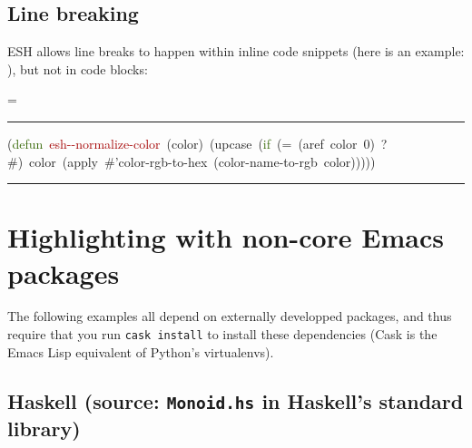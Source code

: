 \documentclass{article}
\makeatletter
\newcommand*{\ESHFontSize}{}
\newcommand*{\ESHFontFamily}{\ttfamily}
\newcommand*{\ESHInlineFontSize}{\ESHFontSize}
\newcommand*{\ESHInlineFontFamily}{\ESHFontFamily}
\newcommand*{\ESHInlineFont}{\ESHInlineFontSize\ESHInlineFontFamily}
\newcommand*{\ESHBlockFontSize}{\ESHFontSize}
\newcommand*{\ESHBlockFontFamily}{\ESHFontFamily}
\newcommand*{\ESHBlockFont}{\ESHBlockFontSize\ESHBlockFontFamily}
\newcommand*{\ESHFallbackFontFamily}{\ESHFontFamily}
\newcommand*{\ESHFallbackFont}{\ESHFallbackFontFamily}
\newcommand*{\ESHNoHyphens}{\hyphenpenalty=10000}
\newcommand*{\ESHConstantSpace}{\spaceskip=\fontdimen2\font\xspaceskip=0pt}
\newcommand*{\ESHCenterInWidthOf}[2]
  {\settowidth\ESHtempdim{#1}%
   \makebox[\ESHtempdim][c]{#2}}
\DeclareRobustCommand*{\ESHText}[1]{\ifmmode{\textnormal{#1}}\else{#1}\fi}
\newcommand*{\ESHIfFontChar}[1]
  {\iffontchar\font`#1{#1}\else{\ESHFallbackFont#1}\fi}
\def\ESHWithFallback#1{\ESHFallbackFont#1}}
\def\ESHWithFallback#1{\ESHIfFontChar{#1}}}}
\def\ESHWithFallback#1{%
     \ifnum\XeTeXfonttype\font>0%
       \ESHIfFontChar{#1}%
     \else%
       \setbox0=\hbox{\tracinglostchars=0\kern1sp#1\expandafter}%
       \ifnum\lastkern=1{\ESHFallbackFont#1}\else{#1}\fi
     \fi}}
\DeclareRobustCommand*{\ESHInlineSpecialChar}[1]
  {{\ESHInlineFontFamily\ESHWithFallback{#1}}}
\DeclareRobustCommand*{\ESHBlockSpecialChar}[1]
  {{\ESHCenterInWidthOf{\ESHBlockFontFamily{a}}{\ESHBlockFontFamily\ESHWithFallback{#1}}}}
\DeclareRobustCommand*{\ESHInlineUnicodeSubstitution}[1]
  {{\ESHInlineFontFamily#1}}
\DeclareRobustCommand*{\ESHBlockUnicodeSubstitution}[1]
  {{\ESHCenterInWidthOf{\ESHBlockFontFamily{a}}{\ESHBlockFontFamily#1}}}
\DeclareRobustCommand*{\ESHInlineRaise}[2]
  {\raisebox{#1}{\relsize{-2}#2}}
\DeclareRobustCommand*{\ESHBlockRaise}[2]
  {\rlap{\ESHInlineRaise{#1}{#2}}\hphantom{#2}}
\newlength{\ESHBaselineskip}
\DeclareRobustCommand*{\ESHBlockStrut}[1]
  {\rule{0pt}{#1\ESHBaselineskip}}
\newcommand*{\ESHInlineSlantItalic}[1]{\textit{#1}}
\newcommand*{\ESHBlockSlantItalic}[1]{{\itshape{#1}}} %
\newcommand*{\ESHBreakingSpace}{\ }
\newcommand*{\ESHNonbreakingSpace}{~}
\let\ESHSpecialChar\ignorespaces%
\let\ESHUnicodeSubstitution\ignorespaces%
\let\ESHRaise\ignorespaces%
\let\ESHBol\ignorespaces%
\let\ESHEol\ignorespaces%
\let\ESHSpace\ignorespaces%
\let\ESHDash\ignorespaces%
\let\ESHSlantItalic\ignorespaces%
\DeclareRobustCommand*{\ESHInlineInternalSetup}
  {\def\ESHSpecialChar{\ESHInlineSpecialChar}\def\ESHUnicodeSubstitution{\ESHInlineUnicodeSubstitution}%
   \def\ESHRaise{\ESHInlineRaise}\def\ESHSlantItalic{\ESHInlineSlantItalic}%
   \def\ESHStrut{\relax}\def\ESHBol{\relax}\def\ESHEol{\newline}\def\ESHSpace{\ESHBreakingSpace}%
   \def\ESHDash{-}}
\DeclareRobustCommand*{\ESHBlockInternalSetup}
  {\def\ESHSpecialChar{\ESHBlockSpecialChar}\def\ESHUnicodeSubstitution{\ESHBlockUnicodeSubstitution}%
   \def\ESHRaise{\ESHBlockRaise}\def\ESHSlantItalic{\ESHBlockSlantItalic}%
   \setlength{\ESHBaselineskip}{\baselineskip}\def\ESHStrut{\ESHBlockStrut}%
   \def\ESHBol{\-}\def\ESHEol{\newline}\def\ESHSpace{\ESHNonbreakingSpace}\def\ESHDash{\hbox{-}\nobreak}}
\newcommand*{\ESHInlineBasicSetup}
  {\leavevmode\ESHNoHyphens\ESHInlineFont}
\newcommand*{\ESHBlockBasicSetup}
  {\setlength{\parindent}{0pt}\raggedright\ESHNoHyphens%
   \ESHBlockFont\ESHConstantSpace}
\newcommand*{\ESHHook}{}
\newcommand*{\ESHInlineHook}{\ESHHook}
\newcommand*{\ESHBlockHook}{\ESHHook}
\DeclareRobustCommand*{\ESHInline}[1]
  {\bgroup\ESHText{\ESHInlineInternalSetup\ESHInlineBasicSetup\ESHInlineHook#1}\egroup}
\newlength{\ESHSkip}
\newcommand*{\ESHNoBreakAddVSpace}[1]{\addpenalty{\@M}\addvspace{#1}}
\newenvironment{ESHBlock}
  {\par\ESHNoBreakAddVSpace{\ESHSkip}\bgroup\ESHBlockInternalSetup\ESHBlockBasicSetup\ESHBlockHook}
  {\par\egroup\addvspace{\ESHSkip}}
\renewcommand{\ESHFontFamily}{\UbuntuMono}
\renewcommand{\ESHFallbackFontFamily}{\XITSMath}
\newcommand{\angles}[1]{$\langle\,$#1$\,\rangle$}
\DeclareRobustCommand*{\ESHInline}[1]
  {{\ESHText{\ESHInlineInternalSetup\ESHInlineBasicSetup\angles{#1}}}}
\renewenvironment{ESHBlock}{%
  \par\ESHNoBreakAddVSpace{\ESHSkip}\bgroup\ESHBlockInternalSetup\ESHBlockBasicSetup%
  \hrule\addvspace{0.5em}%
}{%
  \par\egroup\addvspace{0.5em}\hrule\addvspace{2\ESHSkip}%
}
\makeatother
\begin{document}
\subsection*{Line breaking}

ESH allows line breaks to happen within inline code snippets (here is an example: \ESHInline{\ESHBol{}\textcolor[HTML]{346604}{private}\ESHSpace{}\textcolor[HTML]{346604}{static}\ESHSpace{}\textcolor[HTML]{346604}{volatile}\ESHSpace{}\textcolor[HTML]{204A87}{int}\ESHSpace{}\textcolor[HTML]{B35000}{counter}\ESHSpace{}=\ESHSpace{}0}), but not in code blocks:

\begin{ESHBlock}
\ESHBol{}(\textcolor[HTML]{346604}{defun}\ESHSpace{}\textcolor[HTML]{A40000}{esh\ESHDash{}\ESHDash{}normalize\ESHDash{}color}\ESHSpace{}(color)\ESHSpace{}(upcase\ESHSpace{}(\textcolor[HTML]{346604}{if}\ESHSpace{}(=\ESHSpace{}(aref\ESHSpace{}color\ESHSpace{}0)\ESHSpace{}?\#)\ESHSpace{}color\ESHSpace{}(apply\ESHSpace{}\#{'}color\ESHDash{}rgb\ESHDash{}to\ESHDash{}hex\ESHSpace{}(color\ESHDash{}name\ESHDash{}to\ESHDash{}rgb\ESHSpace{}color)))))
\end{ESHBlock}


\section*{Highlighting with non-core Emacs packages}

The following examples all depend on externally developped packages, and thus
require that you run \texttt{cask install} to install these dependencies (Cask
is the Emacs Lisp equivalent of Python's virtualenvs).

\subsection*{Haskell (source: \texttt{Monoid.hs} in Haskell's standard library)}
\end{document}
